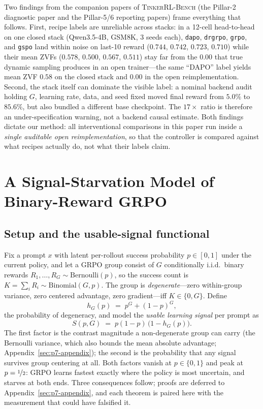 \documentclass{article}
\newcommand{\ours}{\textsc{TinkerRL-Bench}}
\begin{document}
Two findings from the companion papers of \ours{} (the Pillar-2 diagnostic
paper and the Pillar-5/6 reporting papers) frame everything that follows.
First, recipe labels
are unreliable across stacks: in a 12-cell head-to-head on one closed stack
(Qwen3.5-4B, GSM8K, 3 seeds each), \texttt{dapo}, \texttt{drgrpo},
\texttt{grpo}, and \texttt{gspo} land within noise on last-10 reward
($0.744$, $0.742$, $0.723$, $0.710$) while their mean ZVFs ($0.578$, $0.500$,
$0.567$, $0.511$) stay far from the $0.00$ that true dynamic sampling
produces in an open trainer---the same ``DAPO'' label yields mean ZVF $0.58$
on the closed stack and $0.00$ in the open reimplementation. Second, the
stack itself can dominate the visible label: a nominal backend audit holding
$G$, learning rate, data, and seed fixed moved final reward from $5.0\%$ to
$85.6\%$, but also bundled a different base checkpoint. The $17\times$ ratio
is therefore an under-specification warning, not a backend causal estimate.
Both findings dictate our method: all
interventional comparisons in this paper run inside a \emph{single auditable
open reimplementation}, so that the controller is compared against what
recipes actually do, not what their labels claim.
 \section{A Signal-Starvation Model of Binary-Reward GRPO}
\label{sec:p7-theory}

\subsection{Setup and the usable-signal functional}
\label{sec:p7-theory-setup}
Fix a prompt $x$ with latent per-rollout success probability $p \in [0,1]$
under the current policy, and let a GRPO group consist of $G$ conditionally
i.i.d.\ binary rewards $R_1, \dots, R_G \sim \mathrm{Bernoulli}(p)$, so the
success count is $K = \sum_i R_i \sim \mathrm{Binomial}(G, p)$. The group is
\emph{degenerate}---zero within-group variance, zero centered advantage, zero
gradient---iff $K \in \{0, G\}$. Define
\begin{equation}
  h_G(p) \;=\; p^G + (1-p)^G,
  \label{eq:p7-hG}
\end{equation}
the probability of degeneracy, and model the \emph{usable learning signal}
per prompt as
\begin{equation}
  S(p, G) \;=\; p(1-p)\,\bigl(1 - h_G(p)\bigr).
  \label{eq:p7-S}
\end{equation}
The first factor is the contrast magnitude a non-degenerate group can carry
(the Bernoulli variance, which also bounds the mean absolute advantage;
Appendix~\ref{sec:p7-appendix}); the second is the probability that any
signal survives group centering at all. Both factors vanish at $p \in
\{0,1\}$ and peak at $p = \nicefrac{1}{2}$: GRPO learns fastest exactly where
the policy is most uncertain, and starves at both ends. Three consequences
follow; proofs are deferred to Appendix~\ref{sec:p7-appendix}, and each
theorem is paired here with the measurement that could have falsified it.
\end{document}
